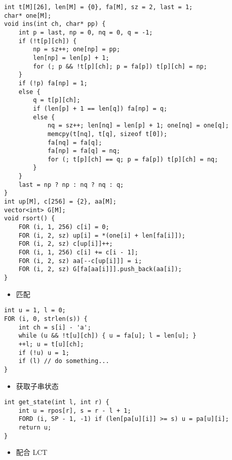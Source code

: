 \documentclass[]{article}
\providecommand{\tightlist}{%
  \setlength{\itemsep}{0pt}\setlength{\parskip}{0pt}}
\begin{document}
\begin{verbatim}
int t[M][26], len[M] = {0}, fa[M], sz = 2, last = 1;
char* one[M];
void ins(int ch, char* pp) {
    int p = last, np = 0, nq = 0, q = -1;
    if (!t[p][ch]) {
        np = sz++; one[np] = pp;
        len[np] = len[p] + 1;
        for (; p && !t[p][ch]; p = fa[p]) t[p][ch] = np;
    }
    if (!p) fa[np] = 1;
    else {
        q = t[p][ch];
        if (len[p] + 1 == len[q]) fa[np] = q;
        else {
            nq = sz++; len[nq] = len[p] + 1; one[nq] = one[q];
            memcpy(t[nq], t[q], sizeof t[0]);
            fa[nq] = fa[q];
            fa[np] = fa[q] = nq;
            for (; t[p][ch] == q; p = fa[p]) t[p][ch] = nq;
        }
    }
    last = np ? np : nq ? nq : q;
}
int up[M], c[256] = {2}, aa[M];
vector<int> G[M];
void rsort() {
    FOR (i, 1, 256) c[i] = 0;
    FOR (i, 2, sz) up[i] = *(one[i] + len[fa[i]]);
    FOR (i, 2, sz) c[up[i]]++;
    FOR (i, 1, 256) c[i] += c[i - 1];
    FOR (i, 2, sz) aa[--c[up[i]]] = i;
    FOR (i, 2, sz) G[fa[aa[i]]].push_back(aa[i]);
}
\end{verbatim}

\begin{itemize}
\tightlist
\item
  匹配
\end{itemize}

\begin{verbatim}
int u = 1, l = 0;
FOR (i, 0, strlen(s)) {
    int ch = s[i] - 'a';
    while (u && !t[u][ch]) { u = fa[u]; l = len[u]; }
    ++l; u = t[u][ch];
    if (!u) u = 1;
    if (l) // do something...
}
\end{verbatim}

\begin{itemize}
\tightlist
\item
  获取子串状态
\end{itemize}

\begin{verbatim}
int get_state(int l, int r) {
    int u = rpos[r], s = r - l + 1;
    FORD (i, SP - 1, -1) if (len[pa[u][i]] >= s) u = pa[u][i];
    return u;
}
\end{verbatim}

\begin{itemize}
\tightlist
\item
  配合 LCT
\end{itemize}
\end{document}
